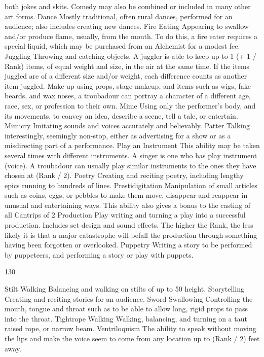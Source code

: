 \documentclass[a4paper]{article}
\begin{document}
\begin{multicols}{3}
both jokes and skits. Comedy may also be combined or included in many other art forms.
Dance Mostly traditional, often rural dances, performed for an audience; also includes creating new
dances.
Fire Eating Appearing to swallow and/or produce
flame, usually, from the mouth. To do this, a fire
eater requires a special liquid, which may be purchased from an Alchemist for a modest fee.
Juggling Throwing and catching objects. A juggler
is able to keep up to 1 (+ 1 / Rank) items, of equal
weight and size, in the air at the same time. If the
items juggled are of a different size and/or weight,
each difference counts as another item juggled.
Make-up using props, stage makeup, and items
such as wigs, fake beards, and wax noses, a troubadour can portray a character of a different age,
race, sex, or profession to their own.
Mime Using only the performer’s body, and its
movements, to convey an idea, describe a scene,
tell a tale, or entertain.
Mimicry Imitating sounds and voices accurately
and believably.
Patter Talking interestingly, seemingly non-stop,
either as advertising for a show or as a misdirecting
part of a performance.
Play an Instrument This ability may be taken
several times with different instruments. A singer
is one who has play instrument (voice). A troubadour can usually play similar instruments to the
ones they have chosen at (Rank / 2).
Poetry Creating and reciting poetry, including
lengthy epics running to hundreds of lines.
Prestidigitation Manipulation of small articles
such as coins, eggs, or pebbles to make them move,
disappear and reappear in unusual and entertaining
ways. This ability also gives a bonus to the casting
of all Cantrips of 2%
Production Play writing and turning a play into a
successful production. Includes set design and
sound effects. The higher the Rank, the less likely
it is that a major catastrophe will befall the production through something having been forgotten or
overlooked.
Puppetry Writing a story to be performed by
puppeteers, and performing a story or play with
puppets.

130

Stilt Walking Balancing and walking on stilts of
up to 50%
height.
Storytelling Creating and reciting stories for an
audience.
Sword Swallowing Controlling the mouth, tongue
and throat such as to be able to allow long, rigid
props to pass into the throat.
Tightrope Walking Walking, balancing, and
turning on a taut raised rope, or narrow beam.
Ventriloquism The ability to speak without moving the lips and make the voice seem to come from
any location up to (Rank / 2) feet away.


\end{multicols}
\end{document}
